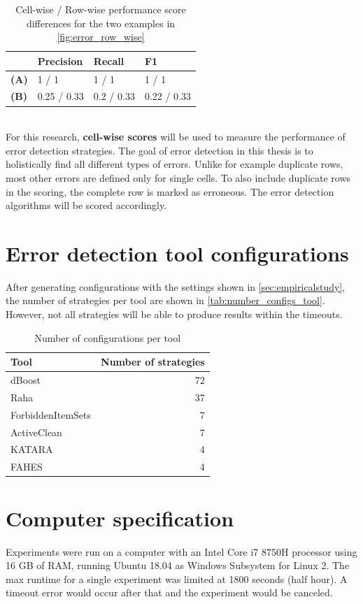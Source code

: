 \begin{table}[h]
\centering
\begin{tabular}{l|lll}
\textbf{}    & \textbf{Precision} & \textbf{Recall} & \textbf{F1} \\ \hline
\textbf{(A)} & 1 / 1              & 1 / 1           & 1 / 1       \\
\textbf{(B)} & 0.25 / 0.33        & 0.2 / 0.33      & 0.22 / 0.33
\end{tabular}
\caption{Cell-wise / Row-wise performance score differences for the two examples in \autoref{fig:error_row_wise}}
\label{tab:cell_vs_row_scores}
\end{table}

~\\For this research, \textbf{cell-wise scores} will be used to measure the performance of error detection strategies. The goal of error detection in this thesis is to holistically find all different types of errors. Unlike for example duplicate rows, most other errors are defined only for single cells. To also include duplicate rows in the scoring, the complete row is marked as erroneous. The error detection algorithms will be scored accordingly.

\section{Error detection tool configurations}
After generating configurations with the settings shown in \autoref{sec:empiricalstudy}, the number of strategies per tool are shown in \autoref{tab:number_configs_tool}. However, not all strategies will be able to produce results within the timeouts.

\begin{table}[H]
\centering
\begin{tabular}{lr}
\toprule
Tool &  Number of strategies \\
\midrule
dBoost            &                  72 \\
Raha              &                  37 \\
ForbiddenItemSets &                   7 \\
ActiveClean       &                   7 \\
KATARA            &                   4 \\
FAHES             &                   4 \\
\bottomrule
\end{tabular}
\caption{Number of configurations per tool}
\label{tab:number_configs_tool}
\end{table}


\section{Computer specification}
Experiments were run on a computer with an Intel Core i7 8750H processor using 16 GB of RAM, running Ubuntu 18.04 as Windows Subsystem for Linux 2. %
The max runtime for a single experiment was limited at 1800 seconds (half hour). A timeout error would occur after that and the experiment would be canceled. 